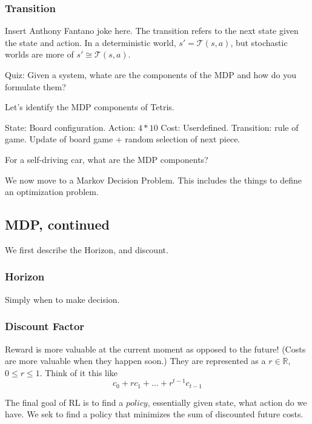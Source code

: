 \documentclass[10pt, oneside]{article}
\theoremstyle{definition}
\begin{document}
\subsubsection{Transition}
Insert Anthony Fantano joke here. The transition refers to the next state given the state and action. In a deterministic world, $s' = \mathcal{T}(s,a)$, but stochastic worlds are more of $s' \cong \mathcal{T}(s,a)$.

Quiz: Given a system, whate are the components of the MDP and how do you formulate them?

Let's identify the MDP components of Tetris.

State: Board configuration. 
Action: $4 * 10$
Cost: Userdefined. 
Transition: rule of game. Update of board game + random selection of next piece. 


For a self-driving car, what are the MDP components?

We now move to a Markov Decision Problem. This includes the things to define an optimization problem.
\subsection{MDP, continued}
We first describe the Horizon, and discount. 
\subsubsection{Horizon}
Simply when to make decision.
\subsubsection{Discount Factor}
Reward is more valuable at the current moment as opposed to the future! (Costs are more valuable when they happen soon.) They are represented as a $r \in \mathbb{R}$, $0 \leq r \leq 1$. Think of it this like 
\[c_0 + rc_1 + ... + r^{t-1}c_{t-1}\]

The final goal of RL is to find a $\textit{policy}$, essentially given state, what action do we have. We sek to find a policy that minimizes the sum of discounted future costs. 
\end{document}
